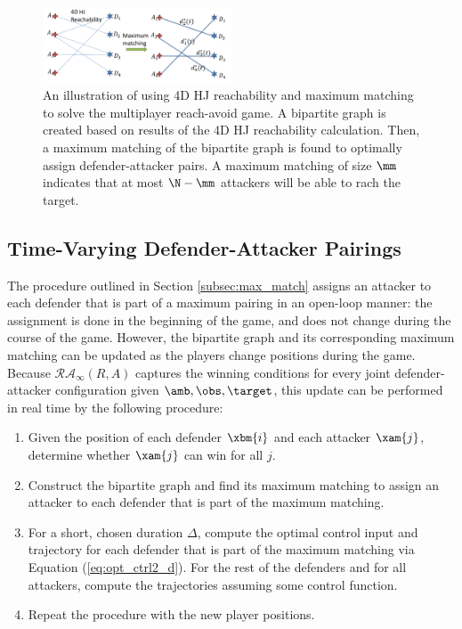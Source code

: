 \begin{figure}[h]
\centering
\includegraphics[width=0.5\textwidth]{"fig/general procedure"}
\caption{An illustration of using 4D HJ reachability and maximum matching to solve the multiplayer reach-avoid game. A bipartite graph is created based on results of the 4D HJ reachability calculation. Then, a maximum matching of the bipartite graph is found to optimally assign defender-attacker pairs. A maximum matching of size $\mm$ indicates that at most $\N-\mm$ attackers will be able to rach the target.}
\label{fig:general_procedure}
\end{figure}

\subsection{Time-Varying Defender-Attacker Pairings}
\label{subsec:tvarp}
The procedure outlined in Section \ref{subsec:max_match} assigns an attacker to each defender that is part of a maximum pairing in an open-loop manner: the assignment is done in the beginning of the game, and does not change during the course of the game. However, the bipartite graph and its corresponding maximum matching can be updated as the players change positions during the game. Because $\mathcal{RA}_\infty(R,A)$ captures the winning conditions for every joint defender-attacker configuration given $\amb,\obs,\target$, this update can be performed in real time by the following procedure:

\begin{enumerate}
\item Given the position of each defender $\xbm{i}$ and each attacker $\xam{j}$, determine whether $\xam{j}$ can win for all $j$. 
\item Construct the bipartite graph and find its maximum matching to assign an attacker to each defender that is part of the maximum matching.
\item For a short, chosen duration $\Delta$, compute the optimal control input and trajectory for each defender that is part of the maximum matching via Equation (\ref{eq:opt_ctrl2_d}). For the rest of the defenders and for all attackers, compute the trajectories assuming some control function.
\item Repeat the procedure with the new player positions.
\end{enumerate}

